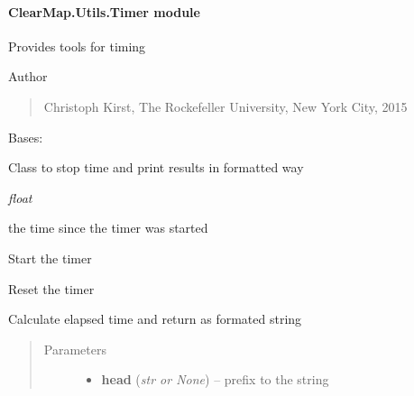 \documentclass[letterpaper,10pt,english]{sphinxmanual}
\begin{document}
\paragraph{ClearMap.Utils.Timer module}
\label{api/ClearMap.Utils:module-ClearMap.Utils.Timer}\label{api/ClearMap.Utils:clearmap-utils-timer-module}
Provides tools for timing

Author
\begin{quote}

Christoph Kirst, The Rockefeller University, New York City, 2015
\end{quote}

\begin{fulllineitems}
\label{api/ClearMap.Utils:ClearMap.Utils.Timer.Timer}
Bases: 

Class to stop time and print results in formatted way

\begin{fulllineitems}
\label{api/ClearMap.Utils:ClearMap.Utils.Timer.Timer.time}
\emph{float}

the time since the timer was started

\end{fulllineitems}


\begin{fulllineitems}
\label{api/ClearMap.Utils:ClearMap.Utils.Timer.Timer.start}
Start the timer

\end{fulllineitems}


\begin{fulllineitems}
\label{api/ClearMap.Utils:ClearMap.Utils.Timer.Timer.reset}
Reset the timer

\end{fulllineitems}


\begin{fulllineitems}
\label{api/ClearMap.Utils:ClearMap.Utils.Timer.Timer.elapsedTime}
Calculate elapsed time and return as formated string
\begin{quote}\begin{description}
\item[{Parameters}] \leavevmode\begin{itemize}
\item {} 
\textbf{head} (\emph{str or None}) --
prefix to the string


\end{itemize}
\end{description}
\end{quote}
\end{fulllineitems}
\end{fulllineitems}
\end{document}
